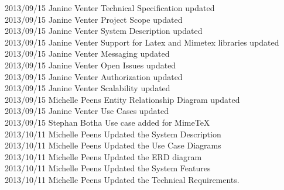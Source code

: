 \documentclass[29pt,a4paper]{moderncv}
\begin{document}
\begin{tabbing}
2013/09/15  \>  Janine Venter \> Technical Specification updated\\
2013/09/15  \> Janine Venter \> Project Scope updated\\
2013/09/15  \>  Janine Venter \> System Description updated\\
2013/09/15 \> Janine Venter \> Support for Latex and Mimetex libraries updated\\
2013/09/15  \> Janine Venter \> Messaging updated\\
2013/09/15  \>  Janine Venter \> Open Issues updated\\
2013/09/15  \> Janine Venter \> Authorization updated\\
2013/09/15  \> Janine Venter \> Scalability updated\\
2013/09/15  \> Michelle Peens \> Entity Relationship Diagram updated\\
2013/09/15  \> Janine Venter \> Use Cases updated\\
2013/09/15  \> Stephan Botha \> Use case added for MimeTeX\\
2013/10/11  \> Michelle Peens \> Updated the System Description\\
2013/10/11  \> Michelle Peens \> Updated the Use Case Diagrams\\
2013/10/11  \> Michelle Peens \> Updated the ERD diagram\\
2013/10/11  \> Michelle Peens \> Updated the System Features\\
2013/10/11  \> Michelle Peens \> Updated the Technical Requirements.\\


\end{tabbing}


\newpage
\end{document}
